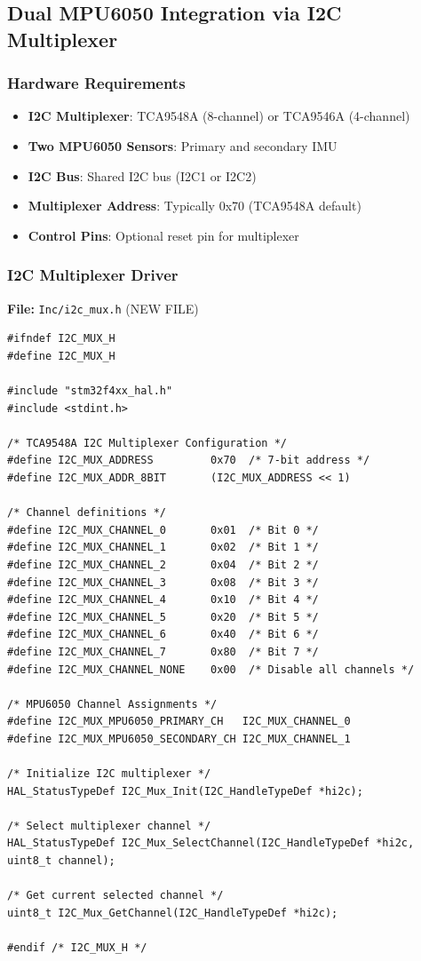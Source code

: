 \documentclass[11pt,a4paper]{article}
\begin{document}
\subsection{Dual MPU6050 Integration via I2C Multiplexer}

\subsubsection{Hardware Requirements}
\begin{itemize}
    \item \textbf{I2C Multiplexer}: TCA9548A (8-channel) or TCA9546A (4-channel)
    \item \textbf{Two MPU6050 Sensors}: Primary and secondary IMU
    \item \textbf{I2C Bus}: Shared I2C bus (I2C1 or I2C2)
    \item \textbf{Multiplexer Address}: Typically 0x70 (TCA9548A default)
    \item \textbf{Control Pins}: Optional reset pin for multiplexer
\end{itemize}

\subsubsection{I2C Multiplexer Driver}

\textbf{File:} \texttt{Inc/i2c\_mux.h} (NEW FILE)

\begin{lstlisting}[caption=I2C Multiplexer Header, label=lst:i2cmuxh]
#ifndef I2C_MUX_H
#define I2C_MUX_H

#include "stm32f4xx_hal.h"
#include <stdint.h>

/* TCA9548A I2C Multiplexer Configuration */
#define I2C_MUX_ADDRESS         0x70  /* 7-bit address */
#define I2C_MUX_ADDR_8BIT       (I2C_MUX_ADDRESS << 1)

/* Channel definitions */
#define I2C_MUX_CHANNEL_0       0x01  /* Bit 0 */
#define I2C_MUX_CHANNEL_1       0x02  /* Bit 1 */
#define I2C_MUX_CHANNEL_2       0x04  /* Bit 2 */
#define I2C_MUX_CHANNEL_3       0x08  /* Bit 3 */
#define I2C_MUX_CHANNEL_4       0x10  /* Bit 4 */
#define I2C_MUX_CHANNEL_5       0x20  /* Bit 5 */
#define I2C_MUX_CHANNEL_6       0x40  /* Bit 6 */
#define I2C_MUX_CHANNEL_7       0x80  /* Bit 7 */
#define I2C_MUX_CHANNEL_NONE    0x00  /* Disable all channels */

/* MPU6050 Channel Assignments */
#define I2C_MUX_MPU6050_PRIMARY_CH   I2C_MUX_CHANNEL_0
#define I2C_MUX_MPU6050_SECONDARY_CH I2C_MUX_CHANNEL_1

/* Initialize I2C multiplexer */
HAL_StatusTypeDef I2C_Mux_Init(I2C_HandleTypeDef *hi2c);

/* Select multiplexer channel */
HAL_StatusTypeDef I2C_Mux_SelectChannel(I2C_HandleTypeDef *hi2c, uint8_t channel);

/* Get current selected channel */
uint8_t I2C_Mux_GetChannel(I2C_HandleTypeDef *hi2c);

#endif /* I2C_MUX_H */
\end{lstlisting}
\end{document}
